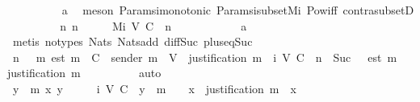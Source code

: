 \begin{isabellebody}
\ \ \ \ \ \ \ \ \isamarkupfalse%
\ a{}\ \isamarkupfalse%
\ {\isacharparenleft}meson\ Params{\isachardot}{\isasymSigma}i{\isacharunderscore}monotonic\ Params{\isachardot}{\isasymSigma}i{\isacharunderscore}subset{\isacharunderscore}Mi\ Pow{\isacharunderscore}iff\ contra{\isacharunderscore}subsetD{\isacharparenright}\isanewline
\ \ \ \ \ \ \isamarkupfalse%
\ \isamarkupfalse%
\ {\isachardoublequoteopen}{\isasymexists}n{\isachardot}\ n\ {\isasymin}\ {\isasymnat}\ {\isasymand}\ {\isasymsigma}\ {\isasymsubseteq}\ M{\isacharunderscore}i\ {\isacharparenleft}V{\isacharcomma}\ C{\isacharcomma}\ {\isasymepsilon}{\isacharparenright}\ {\isacharparenleft}n\ {\isacharminus}\ {}{\isacharparenright}{\isachardoublequoteclose}\isanewline
\ \ \ \ \ \ \ \ \isamarkupfalse%
\ a{}\ \isamarkupfalse%
\ {\isacharparenleft}metis\ {\isacharparenleft}no{\isacharunderscore}types{\isacharparenright}\ Nats{\isacharunderscore}{}\ Nats{\isacharunderscore}add\ diff{\isacharunderscore}Suc{\isacharunderscore}{}\ plus{\isacharunderscore}{}{\isacharunderscore}eq{\isacharunderscore}Suc{\isacharparenright}\isanewline
\ \ \ \ \ \ \isamarkupfalse%
\ \isamarkupfalse%
\ {\isachardoublequoteopen}{\isasymexists}n{\isasymin}{\isasymnat}{\isachardot}\ {\isasymsigma}\ {\isasymsubseteq}\ {\isacharbraceleft}m{\isachardot}\ est\ m\ {\isasymin}\ C\ {\isasymand}\ sender\ m\ {\isasymin}\ V\ {\isasymand}\ justification\ m\ {\isasymin}\ {\isasymSigma}{\isacharunderscore}i\ {\isacharparenleft}V{\isacharcomma}\ C{\isacharcomma}\ {\isasymepsilon}{\isacharparenright}\ {\isacharparenleft}n\ {\isacharminus}\ Suc\ {}{\isacharparenright}\ {\isasymand}\ est\ m\ {\isasymin}\ {\isasymepsilon}\ {\isacharparenleft}justification\ m{\isacharparenright}{\isacharbraceright}{\isachardoublequoteclose}\isanewline
\ \ \ \ \ \ \ \ \isamarkupfalse%
\ auto\isanewline
\ \ \ \ \isamarkupfalse%
\ \isanewline
\ \ \ \ \ \ \isamarkupfalse%
\ {\isachardoublequoteopen}{\isasymAnd}y\ {\isasymsigma}\ m\ x{\isachardot}\ y\ {\isasymin}\ {\isasymnat}\ {\isasymLongrightarrow}\ {\isasymsigma}\ {\isasymin}\ {\isasymSigma}{\isacharunderscore}i\ {\isacharparenleft}V{\isacharcomma}\ C{\isacharcomma}\ {\isasymepsilon}{\isacharparenright}\ y\ {\isasymLongrightarrow}\ m\ {\isasymin}\ {\isasymsigma}\ {\isasymLongrightarrow}\ x\ {\isasymin}\ justification\ m\ {\isasymLongrightarrow}\ x\ {\isasymin}\ {\isasymsigma}{\isachardoublequoteclose}\isanewline

\end{isabellebody}
